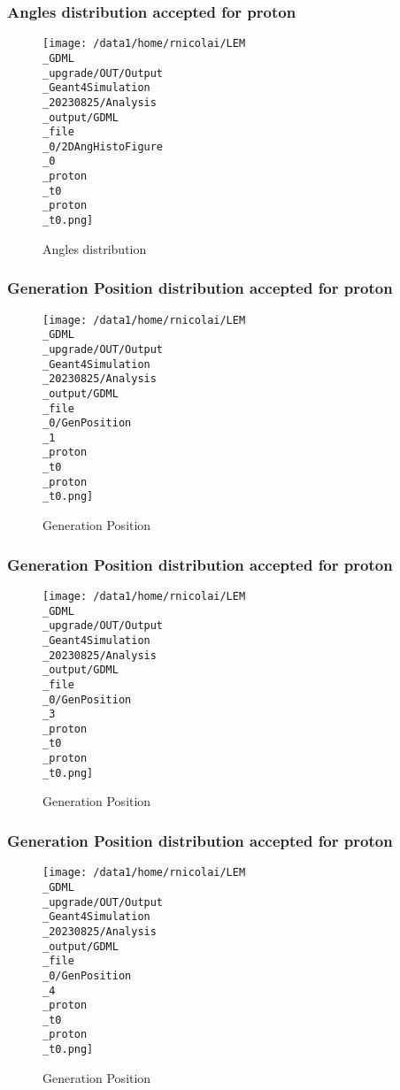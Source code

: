 \documentclass[8pt]{beamer}
\begin{document}
            \begin{frame}
                \frametitle{Angles distribution accepted for proton}
            
        \begin{figure}[h]
            \centering
            \texttt{[image: /data1/home/rnicolai/LEM\\\_GDML\\\_upgrade/OUT/Output\\\_Geant4Simulation\\\_20230825/Analysis\\\_output/GDML\\\_file\\\_0/2DAngHistoFigure\\\_0\\\_proton\\\_t0\\\_proton\\\_t0.png]}
            \caption{Angles distribution}
        \end{figure}
        
            \end{frame}
            
            \begin{frame}
                \frametitle{Generation Position distribution accepted for proton}
            
        \begin{figure}[h]
            \centering
            \texttt{[image: /data1/home/rnicolai/LEM\\\_GDML\\\_upgrade/OUT/Output\\\_Geant4Simulation\\\_20230825/Analysis\\\_output/GDML\\\_file\\\_0/GenPosition\\\_1\\\_proton\\\_t0\\\_proton\\\_t0.png]}
            \caption{Generation Position}
        \end{figure}
        
            \end{frame}
            
            \begin{frame}
                \frametitle{Generation Position distribution accepted for proton}
            
        \begin{figure}[h]
            \centering
            \texttt{[image: /data1/home/rnicolai/LEM\\\_GDML\\\_upgrade/OUT/Output\\\_Geant4Simulation\\\_20230825/Analysis\\\_output/GDML\\\_file\\\_0/GenPosition\\\_3\\\_proton\\\_t0\\\_proton\\\_t0.png]}
            \caption{Generation Position}
        \end{figure}
        
            \end{frame}
            
            \begin{frame}
                \frametitle{Generation Position distribution accepted for proton}
            
        \begin{figure}[h]
            \centering
            \texttt{[image: /data1/home/rnicolai/LEM\\\_GDML\\\_upgrade/OUT/Output\\\_Geant4Simulation\\\_20230825/Analysis\\\_output/GDML\\\_file\\\_0/GenPosition\\\_4\\\_proton\\\_t0\\\_proton\\\_t0.png]}
            \caption{Generation Position}
        \end{figure}
        
            \end{frame}
            
\end{document}
